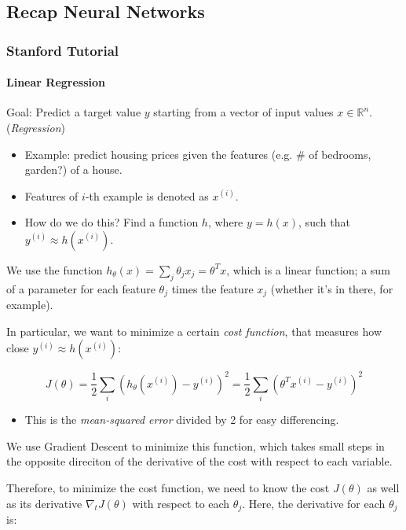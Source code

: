 \documentclass[]{article}
\let\oldparagraph\paragraph
\renewcommand{\paragraph}[1]{\oldparagraph{#1}\mbox{}}
\begin{document}
\subsection{Recap Neural Networks}\label{header-n271}

\subsubsection{Stanford Tutorial}\label{header-n272}

\paragraph{Linear Regression}\label{header-n273}

Goal: Predict a target value \(y\) starting from a vector of input
values \(x \in \mathbb R^n\). (\emph{Regression})

\begin{itemize}
\item
  Example: predict housing prices given the features (e.g. \# of
  bedrooms, garden?) of a house.
\item
  Features of \(i\)-th example is denoted as \(x^{(i)}\). 
\item
  How do we do this? Find a function \(h\), where \(y=h(x)\), such that
  \(y^{(i)} \approx h(x^{(i)})\).
\end{itemize}

We use the function \(h_\theta(x) = \sum_j\theta_jx_j = \theta^Tx\),
which is a linear function; a sum of a parameter for each feature
\(\theta_j\) times the feature \(x_j\) (whether it's in there, for
example).

In particular, we want to minimize a certain \emph{cost function}, that
measures how close \(y^{(i)} \approx h(x^{(i)})\):

\[J(\theta) = \frac 1 2 \sum_i \left(h_\theta(x^{(i)}) - y^{(i)}\right)^2=\frac 1 2 \sum_i \left( \theta^Tx^{(i)} - y^{(i)} \right )^2\]

\begin{itemize}
\item
  This is the \emph{mean-squared error} divided by 2 for easy
  differencing.
\end{itemize}

We use Gradient Descent to minimize this function, which takes small
steps in the opposite direciton of the derivative of the cost with
respect to each variable.

Therefore, to minimize the cost function, we need to know the cost
\(J(\theta)\) as well as its derivative \(\nabla_tJ(\theta)\) with
respect to each \(\theta_j\). Here, the derivative for each \(\theta_j\)
is:
\end{document}
